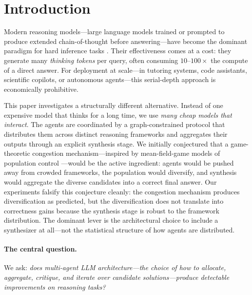 \documentclass[11pt]{amsart}
\newcommand\1{{\mathds{1}}}
\theoremstyle{definition}
\theoremstyle{remark}
\numberwithin{equation}{section}
\begin{document}

\maketitle

\section{Introduction}\label{sec:intro}

Modern reasoning models---large language models trained or prompted to produce extended chain-of-thought before answering---have become the dominant paradigm for hard inference tasks \cite{Wei2022CoT, Wang2023SelfConsistency}.
Their effectiveness comes at a cost: they generate many \emph{thinking tokens} per query, often consuming $10$--$100\times$ the compute of a direct answer.
For deployment at scale---in tutoring systems, code assistants, scientific copilots, or autonomous agents---this serial-depth approach is economically prohibitive.

This paper investigates a structurally different alternative.
Instead of one expensive model that thinks for a long time, we use \emph{many cheap models that interact}.
The agents are coordinated by a graph-constrained protocol that distributes them across distinct reasoning frameworks and aggregates their outputs through an explicit synthesis stage.
We initially conjectured that a game-theoretic congestion mechanism---inspired by mean-field-game models of population control \cite{LasryLions2007, HuangMalhameCaines2006, Gomes2010}---would be the active ingredient: agents would be pushed away from crowded frameworks, the population would diversify, and synthesis would aggregate the diverse candidates into a correct final answer.
Our experiments falsify this conjecture cleanly: the congestion mechanism produces diversification as predicted, but the diversification does not translate into correctness gains because the synthesis stage is robust to the framework distribution. The dominant lever is the architectural choice to include a synthesizer at all---not the statistical structure of how agents are distributed.

\paragraph{The central question.}
We ask: \emph{does multi-agent LLM architecture---the choice of how to allocate, aggregate, critique, and iterate over candidate solutions---produce detectable improvements on reasoning tasks?}
\end{document}
